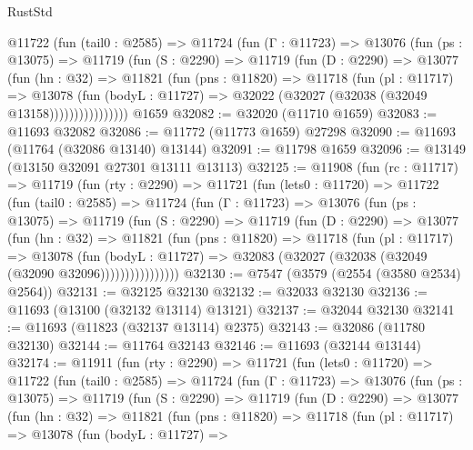 \begin{lexlean}{RustStd}
\begin{coremodule}
          @11722
            (fun (tail0 : @2585) =>
            @11724
              (fun (Γ : @11723) =>
              @13076
                (fun (ps : @13075) =>
                @11719
                  (fun (S : @2290) =>
                  @11719
                    (fun (D : @2290) =>
                    @13077
                      (fun (hn : @32) =>
                      @11821
                        (fun (pns : @11820) =>
                        @11718
                          (fun (pl : @11717) =>
                          @13078
                            (fun (bodyL : @11727) =>
                            @32022 (@32027 (@32038 (@32049 @13158))))))))))))))))
    @1659
@32082 := @32020 (@11710 @1659)
@32083 := @11693 @32082
@32086 := @11772 (@11773 @1659) @27298
@32090 := @11693 (@11764 (@32086 @13140) @13144)
@32091 := @11798 @1659
@32096 := @13149 (@13150 @32091 @27301 @13111 @13113)
@32125 := @11908
    (fun (rc : @11717) =>
    @11719
      (fun (rty : @2290) =>
      @11721
        (fun (lets0 : @11720) =>
        @11722
          (fun (tail0 : @2585) =>
          @11724
            (fun (Γ : @11723) =>
            @13076
              (fun (ps : @13075) =>
              @11719
                (fun (S : @2290) =>
                @11719
                  (fun (D : @2290) =>
                  @13077
                    (fun (hn : @32) =>
                    @11821
                      (fun (pns : @11820) =>
                      @11718
                        (fun (pl : @11717) =>
                        @13078
                          (fun (bodyL : @11727) =>
                          @32083 (@32027 (@32038 (@32049 (@32090 @32096))))))))))))))))
@32130 := @7547 (@3579 (@2554 (@3580 @2534) @2564))
@32131 := @32125 @32130
@32132 := @32033 @32130
@32136 := @11693 (@13100 (@32132 @13114) @13121)
@32137 := @32044 @32130
@32141 := @11693 (@11823 (@32137 @13114) @2375)
@32143 := @32086 (@11780 @32130)
@32144 := @11764 @32143
@32146 := @11693 (@32144 @13144)
@32174 := @11911
    (fun (rty : @2290) =>
    @11721
      (fun (lets0 : @11720) =>
      @11722
        (fun (tail0 : @2585) =>
        @11724
          (fun (Γ : @11723) =>
          @13076
            (fun (ps : @13075) =>
            @11719
              (fun (S : @2290) =>
              @11719
                (fun (D : @2290) =>
                @13077
                  (fun (hn : @32) =>
                  @11821
                    (fun (pns : @11820) =>
                    @11718
                      (fun (pl : @11717) =>
                      @13078
                        (fun (bodyL : @11727) =>

\end{coremodule}
\end{lexlean}
